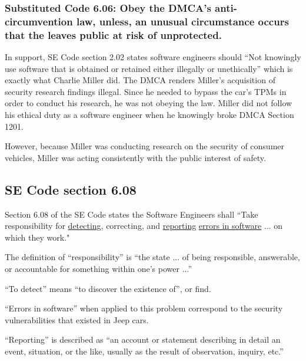 \documentclass[12pt]{article}
\begin{document}
\begin{multicols}{2}
\subsubsection{Substituted Code 6.06: Obey the DMCA's anti-circumvention law, unless, an unusual circumstance occurs that the leaves public at risk of unprotected.}


In support, SE Code section 2.02 states software engineers should ``Not knowingly use software that is obtained or retained either illegally or unethically'' \cite{seCode} which is exactly what Charlie Miller did. The DMCA renders Miller's acquisition of security research findings illegal.  Since he needed to bypass the car's TPMs in order to conduct his research, he was not obeying the law. Miller did not follow his ethical duty as a software engineer when he knowingly broke DMCA Section 1201.

However, because Miller was conducting research on the security of consumer vehicles, Miller was acting consistently with the public interest of safety.



\subsection{SE Code section 6.08}

Section 6.08 of the SE Code states the Software Engineers shall ``Take responsibility for \underline{detecting}, correcting, and \underline{reporting} \underline{errors in software} ... on which they work."\cite{seCode}

The definition of ``responsibility'' is ``the state ... of being responsible, answerable, or accountable for something within one's power ...''\cite{dictionary}

``To detect'' means ``to discover the existence of''\cite{dictionary}, or find.

``Errors in software'' when applied to this problem correspond to the security vulnerabilities that existed in Jeep cars. 

``Reporting'' is described as ``an account or statement describing in detail an event, situation, or the like, usually as the result of observation, inquiry, etc.''\cite{dictionary}


\end{multicols}
\end{document}
